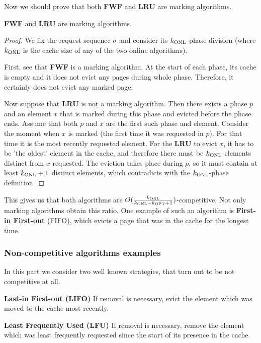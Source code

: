 Now we should prove that both \textbf{FWF} and \textbf{LRU} are
marking algorithms.
\begin{propo}
 \textbf{FWF} and \textbf{LRU} are marking algorithms.
\end{propo}
\begin{proof}
 We fix the request sequence $\sigma$ and consider its $k_{\mathrm{ONL}}$-phase division 
(where $k_{\mathrm{ONL}}$ is the cache size of any of the two online algorithms).

First, see that \textbf{FWF} is a marking algorithm. At the start of each phase, 
its cache is empty and it does not evict any pages during whole phase. 
Therefore, it certainly does not evict any marked page.

Now suppose that \textbf{LRU} is not a marking algorithm. Then there exists a 
phase $p$ and an element $x$ that is marked during this phase and evicted before 
the phase ends. Assume that both $p$ and $x$ are the first such phase and element. 
Consider the moment when $x$ is marked (the first time it was requested in $p$). 
For that time it is the most recently requested element. For the \textbf{LRU} to 
evict $x$, it has to be 'the oldest' element in the cache, and therefore there must be 
$k_{\mathrm{ONL}}$ elements distinct from $x$ requested. The eviction takes place 
during $p$, so it must contain 
at least $k_{\mathrm{ONL}}+1$ distinct elements, which contradicts with the $k_{\mathrm{ONL}}$-phase definition. 
\end{proof}
This gives us that both algorithms are $O(\frac{k_{\mathrm{ONL}}}{k_{\mathrm{ONL}}-k_{\mathrm{OPT}}+1})$-competitive. Not 
only marking algorithms obtain this ratio. One example of such an algorithm is 
\textbf{First-in First-out} (FIFO), which evicts a page that was in the cache for 
the longest time.

\subsubsection{Non-competitive algorithms examples}
In this part we consider two well known strategies, that turn out to be not 
competitive at all.
\begin{myalgo}
 \textbf{Last-in First-out (LIFO)}
 \newline
If removal is necessary, evict the element which was moved to the cache most 
recently.
\end{myalgo}
\begin{myalgo}
 \textbf{Least Frequently Used (LFU)}
 \newline
If removal is necessary, remove the element which was least frequently requested since the start of its 
presence in the cache.
\end{myalgo}

